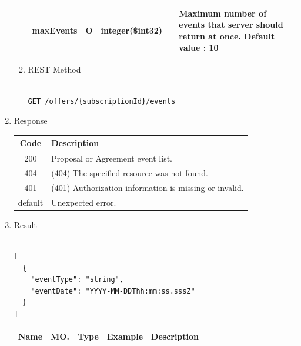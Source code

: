 \begin{enumerate}
\begin{enumerate}
\begin{center}
\begin{tabular}{|p{3cm}|l|p{3cm}|p{3cm}|p{4cm}|}
\hline

maxEvents		& O & integer(\$int32)	&		&	Maximum number of events that server should return at once.		Default value : 10 \\

\hline	

\end{tabular}
\end{center}

\item REST Method

\begin{tcolorbox}[boxrule=0pt, frame empty]
\begin{verbatim} 

GET /offers/{subscriptionId}/events

\end{verbatim}
\end{tcolorbox}

\end{enumerate}

\item Response

\begin{center}
\begin{tabular}{|c|l|} 
\hline
\rowcolor{lightgray}	Code 		& 	Description \\
\hline
200	 		&	Proposal or Agreement event list. \\
\hline
404			&	(404) The specified resource was not found. \\
\hline
401			&	(401) Authorization information is missing or invalid. \\
\hline
default		&	Unexpected error. \\
\hline
\end{tabular}
\end{center}


\item Result

\begin{tcolorbox}[boxrule=0pt, frame empty]
\begin{verbatim}

[
  {
    "eventType": "string",
    "eventDate": "YYYY-MM-DDThh:mm:ss.sssZ"
  }
]

\end{verbatim}
\end{tcolorbox}

\begin{center}
\begin{tabular}{|p{3cm}|l|p{3cm}|p{3cm}|p{4cm}|} 
\hline
\rowcolor{lightgray}	Name	& MO.	& Type	& Example & 	Description \\
\hline


\end{tabular}
\end{center}
\end{enumerate}
